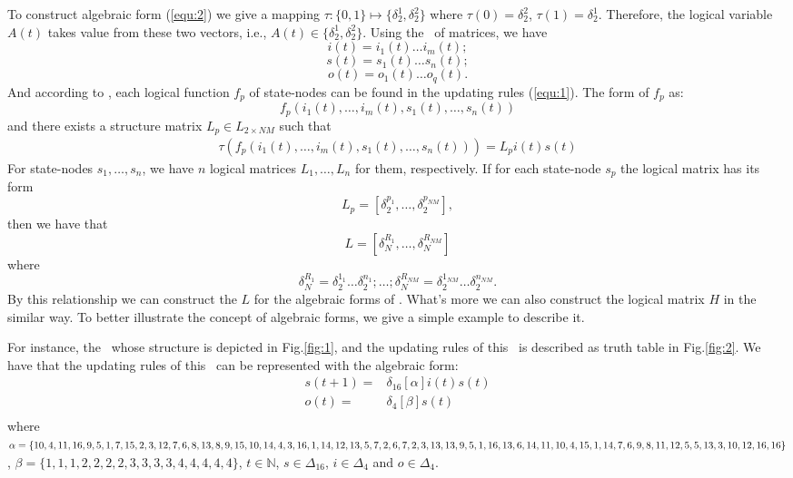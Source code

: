 To construct algebraic form (\ref{equ:2}) we give a mapping $\tau:\{0,1\}\mapsto \{\delta_2^1, \delta_2^2\}$ where $\tau(0)=\delta_2^2$, $\tau(1)= \delta_2^1$. 
Therefore, the logical variable $A(t)$ takes value from these two vectors, i.e., $A(t)\in \{\delta_2^1, \delta_2^2\}$. Using the \STP\ of matrices, we have 
\[i(t)=i_1(t){\ldots}i_m(t);\] 
\[s(t)=s_1(t){\ldots}s_n(t);\] 
\[o(t)=o_1(t){\ldots}o_q(t).\] 
And according to \cite{Cheng2003Semi}, each logical function $f_p$ of state-nodes can be found in the updating rules (\ref{equ:1}). The form of  $f_p$ as:
\[f_p(i_1(t),\ldots,i_m(t),s_1(t),\ldots,s_n(t))\] 
and there exists a structure matrix $L_p\in L_{2\times {NM}}$ such that
\begin{equation}
\begin{split}
\tau(f_p(i_1(t),\ldots,i_m(t),s_1(t),\ldots,s_n(t)))= L_pi(t)s(t)
\end{split}
\end{equation}
For state-nodes $s_1,\ldots,s_n$, we have $n$ logical matrices $L_1,\ldots,L_n$ for them, respectively. 
If for each state-node $s_p$ the logical matrix has its form
\[L_p=[\delta_2^{p_1},\ldots,\delta_2^{p_{NM}}],\] 
then we have that %
\[L=[\delta_N^{R_1},\ldots,\delta_N^{R_{NM}}]\]  where 
\[\delta_N^{R_1}=\delta_2^{1_1}\ldots\delta_2^{n_1};\ldots; \delta_N^{R_{NM}}=\delta_2^{1_{NM}}\ldots\delta_2^{n_{NM}}.\] 
By this relationship we can construct the $L$ for the algebraic forms of \BCNs. What's more we can also construct the logical matrix $H$ in the similar way. To better illustrate the concept of algebraic forms, we give a simple example to describe it.
\begin{example}
For instance, the \BCN\ whose structure is depicted in Fig.\ref{fig:1}, and the updating rules of this \BCN\ is described as truth table in Fig.\ref{fig:2}. We have that the updating rules of this \BCN\ can be represented with the algebraic form:
\begin{equation}
\begin{split}
s(t+1) =&\delta_{16}[\alpha]i(t)s(t)\\
o(t) =&\delta_4[\beta]s(t)\\
\end{split}
\label{equ:4}
\end{equation}
where $\alpha=\{10,4,11,16,9,5,1, 7,15,2,3,12,7,6,8,13,8,9,\\15,10,14,4,3,16,1,14,12,13,5,7,2,6,7,2,3,13,13,9,5,1,\\16,13 ,6,14,11,10,4,15,1,14 ,7,6,9 ,8,11,12,5,5,13,3,10,\\12,16,16\}$, $\beta=\{1,1,1,2,2,2,2,3,3,3,3,4,4,4,4,4\}$, $t\in \mathbb{N}$, $s\in \Delta_{16}$, $i\in \Delta_4$ and $o\in \Delta_4$.
\end{example}   

